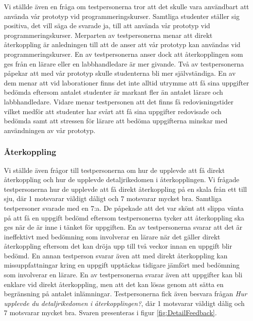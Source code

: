 \documentclass[a4paper,11pt]{article}
\begin{document}
{Vi ställde även en fråga om testpersonerna tror att det skulle vara användbart att använda vår prototyp vid programmeringskurser. Samtliga studenter ställer sig positiva, det vill säga de svarade ja, till att använda vår prototyp vid programmeringskurser. Merparten av testpersonerna menar att direkt återkoppling är anledningen till att de anser att vår prototyp kan användas vid programmeringskurser. En av testpersonerna anser dock att återkopplingen som ges från en lärare eller en labbhandledare är mer givande. Två av testpersonerna påpekar att med vår prototyp skulle studenterna bli mer självständiga. En av dem menar att vid laborationer finns det inte alltid utrymme att få sina uppgifter bedömda eftersom antalet studenter är markant fler än antalet lärare och labbhandledare. Vidare menar testpersonen att det finns få redovisningstider vilket medför att studenter har svårt att få sina uppgifter redovisade och bedömda samt att stressen för lärare att bedöma uppgifterna minskar med användningen av vår prototyp.

\subsubsection{Återkoppling}\label{Återkoppling}

Vi ställde även frågor till testpersonerna om hur de upplevde att få direkt återkoppling och hur de upplevde detaljrikedomen i återkopplingen. Vi frågade testpersonerna hur de upplevde att få direkt återkoppling på en skala från ett till sju, där 1 motsvarar väldigt dåligt och 7 motsvarar mycket bra.
Samtliga testpersoner svarade med en 7:a. De påpekade att det var skönt att slippa vänta på att få en uppgift bedömd eftersom testpersonerna tycker att återkoppling ska ges när de är inne i tänket för uppgiften. En av testpersonerna svarar att det är ineffektivt med bedömning som involverar en lärare när det gäller direkt återkoppling eftersom det kan dröja upp till två veckor innan en uppgift blir bedömd. En annan testperson svarar även att med direkt återkoppling kan missuppfattningar kring en uppgift upptäckas tidigare jämfört med bedömning som involverar en lärare. En av testpersonerna svarar även att uppgifter kan bli enklare vid direkt återkoppling, men att det kan lösas genom att sätta en begränsning på antalet inlämningar.
\newpage
Testpersonerna fick även besvara frågan \textit{Hur upplevde du detaljrikedomen i återkopplingen?}, där 1 motsvarar väldigt dålig och 7 motsvarar mycket bra. Svaren presenteras i figur \ref{fig:DetailFeedback}.

}
\end{document}
